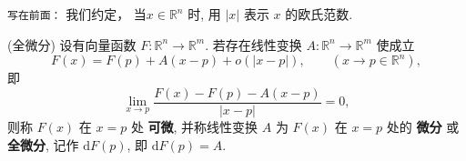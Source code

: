 
\verb|写在前面：| 我们约定， 当$x\in \mathbb{R}^n$ 时, 用 $|x|$ 表示 $x$ 的欧氏范数.
\begin{definition}{(全微分)}
设有向量函数 $F:\mathbb{R}^{n}\rightarrow\mathbb{R}^{m}$. 若存在线性变换 $A:\mathbb{R}^{n}\rightarrow\mathbb{R}^{m}$
使成立
\begin{equation}
F(x)=F(p)+A(x-p)+o(| x-p| ),\quad\quad(x\rightarrow p\in\mathbb{R}^{n}),
\end{equation}
即
\[
{\displaystyle \lim_{x\rightarrow p}{\displaystyle \frac{F(x)-F(p)-A(x-p)}{| x-p| }=0,}}
\]
则称 $F(x)$ 在 $x=p$ 处 \textbf{可微}, 并称线性变换 $A$ 为 $F(x)$ 在 $x=p$ 处\label{linmat_def2}的 \textbf{微分} 或 \textbf{全微分},
记作 $\mathrm{d}F(p)$, 即 $\mathrm{d}F(p)=A.$ 
\end{definition}

